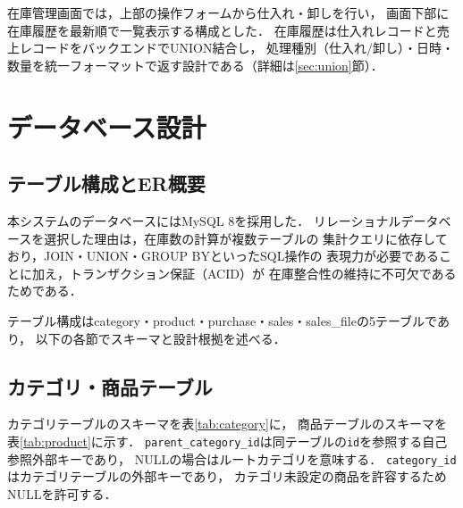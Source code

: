 \documentclass[submit,techrep]{ipsj}
\begin{document}
在庫管理画面では，上部の操作フォームから仕入れ・卸しを行い，
画面下部に在庫履歴を最新順で一覧表示する構成とした．
在庫履歴は仕入れレコードと売上レコードをバックエンドでUNION結合し，
処理種別（仕入れ/卸し）・日時・数量を統一フォーマットで返す設計である（詳細は\ref{sec:union}節）．

\section{データベース設計}

\subsection{テーブル構成とER概要}

本システムのデータベースにはMySQL 8\cite{mysql-docs}を採用した．
リレーショナルデータベースを選択した理由は，在庫数の計算が複数テーブルの
集計クエリに依存しており，JOIN・UNION・GROUP BYといったSQL操作の
表現力が必要であることに加え，トランザクション保証（ACID）が
在庫整合性の維持に不可欠であるためである．

テーブル構成はcategory・product・purchase・sales・sales\_fileの5テーブルであり，
以下の各節でスキーマと設計根拠を述べる．

\subsection{カテゴリ・商品テーブル}

カテゴリテーブルのスキーマを表\ref{tab:category}に，
商品テーブルのスキーマを表\ref{tab:product}に示す．
\texttt{parent\_category\_id}は同テーブルの\texttt{id}を参照する自己参照外部キーであり，
NULLの場合はルートカテゴリを意味する．
\texttt{category\_id}はカテゴリテーブルの外部キーであり，
カテゴリ未設定の商品を許容するためNULLを許可する．
\end{document}
